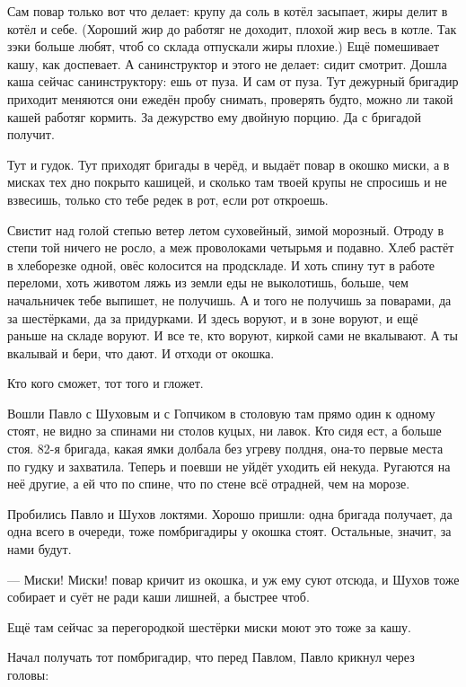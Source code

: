 Сам повар только вот что делает: крупу да соль в котёл засыпает, жиры делит \dash в котёл и себе.
(Хороший жир до работяг не доходит, плохой жир \dash весь в котле. Так зэки больше любят, чтоб со
склада отпускали жиры плохие.) Ещё \dash помешивает кашу, как доспевает. А санинструктор и этого
не делает: сидит смотрит. Дошла каша \dash сейчас санинструктору: ешь от пуза. И сам \dash от пуза.
Тут дежурный бригадир приходит \dash меняются они ежедён \dash пробу снимать, проверять будто,
можно ли такой кашей работяг кормить. За дежурство ему \dash двойную порцию. Да с бригадой
получит.

Тут и гудок. Тут приходят бригады в черёд, и выдаёт повар в окошко миски, а в мисках тех дно
покрыто кашицей, и сколько там твоей крупы \dash не спросишь и не взвесишь, только сто тебе редек
в рот, если рот откроешь.

Свистит над голой степью ветер \dash летом суховейный, зимой морозный. Отроду в степи той ничего
не росло, а меж проволоками четырьмя \dash и подавно. Хлеб растёт в хлеборезке одной, овёс
колосится \dash на продскладе. И хоть спину тут в работе переломи, хоть животом ляжь \dash из земли
еды не выколотишь, больше, чем начальничек тебе выпишет, не получишь. А и того не получишь за
поварами, да за шестёрками, да за придурками. И здесь воруют, и в зоне воруют, и ещё раньше на
складе воруют. И все те, кто воруют, киркой сами не вкалывают. А ты \dash вкалывай и бери, что дают.
И отходи от окошка.

Кто кого сможет, тот того и гложет.

Вошли Павло с Шуховым и с Гопчиком в столовую \dash там прямо один к одному стоят, не видно за
спинами ни столов куцых, ни лавок. Кто сидя ест, а больше стоя. 82-я бригада, какая ямки долбала
без угреву полдня, \dash она-то первые места по гудку и захватила. Теперь и поевши не уйдёт \dash
уходить ей некуда. Ругаются на неё другие, а ей что по спине, что по стене \dash всё отрадней, чем
на морозе.

Пробились Павло и Шухов локтями. Хорошо пришли: одна бригада получает, да одна всего в
очереди, тоже помбригадиры у окошка стоят. Остальные, значит, за нами будут.

--- Миски! Миски! \dash повар кричит из окошка, и уж ему суют отсюда, и Шухов тоже собирает и суёт \dash
не ради каши лишней, а быстрее чтоб.

Ещё там сейчас за перегородкой шестёрки миски моют \dash это тоже за кашу.

Начал получать тот помбригадир, что перед Павлом, \dash Павло крикнул через головы:


